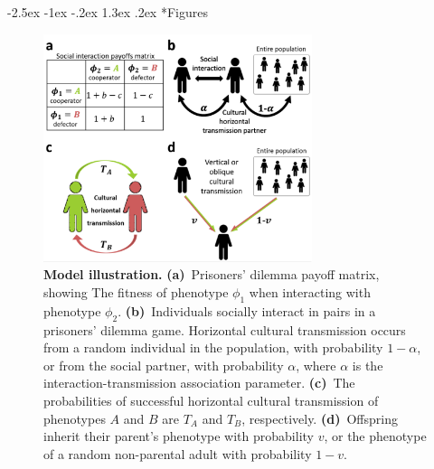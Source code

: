 \documentclass[12pt]{extarticle}
\makeatletter
\renewcommand\section{\@startsection {section}{1}{\z@}%
     {-2.5ex \@plus -1ex \@minus -.2ex}%
     {1.3ex \@plus.2ex}%
    {\Large\bfseries}}
\makeatother
\begin{document}
{\section*{Figures}
\begin{figure}[h]
  \centering
  \includegraphics[width=0.7\textwidth]{Illustration.pdf}
  \caption{\textbf{Model illustration.} 
  \textbf{(a)}~Prisoners' dilemma payoff matrix, showing The fitness of phenotype $\phi_1$ when interacting with phenotype $\phi_2$.
  \textbf{(b)}~Individuals socially interact in pairs in a prisoners' dilemma game. Horizontal cultural transmission occurs from a random individual in the population, with probability $1-\alpha$, or from the social partner, with probability $\alpha$, where $\alpha$ is the interaction-transmission association parameter.
  \textbf{(c)}~The probabilities of successful horizontal  cultural transmission of phenotypes $A$ and $B$ are $T_A$ and $T_B$, respectively.
  \textbf{(d)}~Offspring inherit their parent's phenotype with probability $v$, or the phenotype of a random non-parental adult with probability $1-v$.
    }
  \label{fig:illustration}
\end{figure}




}
\end{document}
